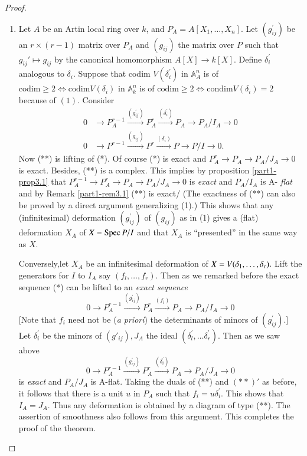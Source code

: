 {\begin{proof}
\begin{enumerate}[(1)]
\item Let $A$ be an Artin local ring over $k$, and
$P_A=A[X_1,\ldots,X_n]$. Let $(g_{ij}^{'})$ be an $r\times(r-1)$
matrix over $P_A$ and $(g_{ij})$ the matrix over $P$ such that
$g_{ij}'\mapsto g_{ij}$ by the canonical homomorphism $A[X]\to
k[X]$. Define $\delta_{i}^{'}$ analogous to $\delta_i$. Suppose that
codim $V(\delta_{i}^{'})$ in $\mathbb{A}_{A}^{n}$ is of
$\text{codim}\ge2\Leftrightarrow\text{codim} V(\delta_i)$ in
$\mathbb{A}_{k}^{n}$ is of $\text{codim}\ge
2\Leftrightarrow\text{condim} V(\delta_i)=2$ because of
$(1)$. Consider 
\begin{align*}
0&\to
P_A^{r-1}\xrightarrow{(g_{ij}^{'})}P_A^{r}\xrightarrow{(\delta_i^{'})}P_A\to
P_A/I_A\to 0\tag{**}\\ 
0&\to P^{r-1}\xrightarrow{(g_{ij})}P^{r}\xrightarrow{(\delta_i)}P\to P/I\to0\tag{*}.
\end{align*}
Now (**) is lifting of (*). Of course (*) is exact and $P_A^{r}\to
P_A\to P_A/J_A\to0$ is exact. Besides, (**) is a  complex. This
implies by proposition \ref{part1-prop3.1} that $P_A^{r-1}\to
P_A^{r}\to P_A\to P_A/J_A\to 0$ is {\em exact} and $P_A/I_A$ is A-{\em
flat} and by Remark \ref{part1-rem3.1} (**) is exact/ (The exactness
of (**) can also be proved by a direct argument generalizing (1).)
This shows that any (infinitesimal) deformation $(g_{ij}^{'})$ of
$(g_{ij})$ as in (1) gives a (flat) deformation $X_A$ of $X = \operatorname{Spec}
P/I$ and that $X_A$ is ``presented'' in the same way as $X$. 

Conversely,\pageoriginale let $X_A$ be an infinitesimal deformation of
$X=V(\delta_1,\ldots,\break\delta_r)$. Lift the generators for $I$ to $I_A$
say $(f_l,\ldots,f_r)$. Then as we remarked before the exact sequence
(*) can be lifted to an {\em exact sequence} 
\begin{equation*}
0\to
P_A^{r-1}\xrightarrow{(g_{ij}^{'})}P_A^{r}\xrightarrow{(f_i)}P_A\to
P_A/I_A\to 0\tag*{$(**)'$} 
\end{equation*}
[Note that $f_i$ need not be ({\em a priori}) the determinants of
minors of $(g^{'}_{ij})$.] Let $\delta^{'}_i$ be the minors of
$(g'_{ij}), J_A$ the ideal $(\delta^{'}_l,\ldots\delta^{'}_r)$. Then
as we saw above 
\begin{equation*}
0\to P_{A}^{r-1}\xrightarrow{(g^{'}_{ij})}P_A^{r}\xrightarrow{(\delta^{'}_i)}P_A\to P_A/J_A\to 0\tag{**}
\end{equation*}
is {\em exact} and $P_A/J_A$ is A-flat. Taking the duals of (**) and
$(**)'$ as before, it follows that there is a unit $u$ in $P_A$ such
that $f_i=u\delta^{'}_i$. This shows that $I_A=J_A$. Thus any
deformation is obtained by a diagram of type (**). The assertion of
smoothness also follows from this argument. This completes the proof
of the theorem. 
\end{enumerate}
\end{proof}

}
